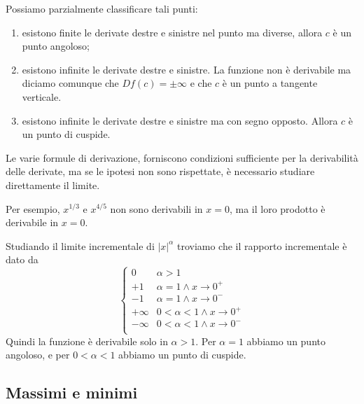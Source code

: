 \documentclass[a4paper]{article}
\begin{document}

Possiamo parzialmente classificare tali punti:
\begin{enumerate}
    \item esistono finite le derivate destre e sinistre nel punto ma diverse, allora
        \(c\) è un punto angoloso;
    \item esistono infinite le derivate destre e sinistre. La funzione non è derivabile ma diciamo
    comunque che \(Df(c) = \pm \infty\) e che \(c\) è un punto a tangente verticale.
    \item esistono infinite le derivate destre e sinistre ma con segno opposto.
        Allora \(c\) è un punto di cuspide.
\end{enumerate}

Le varie formule di derivazione, forniscono condizioni sufficiente
per la derivabilità delle derivate, ma se le ipotesi non sono rispettate,
è necessario studiare direttamente il limite.

Per esempio, \(x^{1/3}\) e \(x^{4/5}\) non sono derivabili in \(x=0\),
ma il loro prodotto è derivabile in \(x=0\).

Studiando il limite incrementale di \({|x|}^\alpha\) troviamo che
il rapporto incrementale è dato da
\[
    \begin{cases}
        0 & \alpha > 1 \\
        +1 & \alpha = 1 \land x \to 0^+ \\
        -1 & \alpha = 1 \land x \to 0^- \\
        +\infty & 0<\alpha<1 \land x \to 0^+ \\
        -\infty & 0<\alpha<1 \land x \to 0^- \\
    \end{cases}
\]
Quindi la funzione è derivabile solo in \(\alpha > 1\).
Per \(\alpha=1\) abbiamo un punto angoloso, e per \(0<\alpha<1\)
abbiamo un punto di cuspide.

\pagebreak

\subsection{Massimi e minimi}

\end{document}
